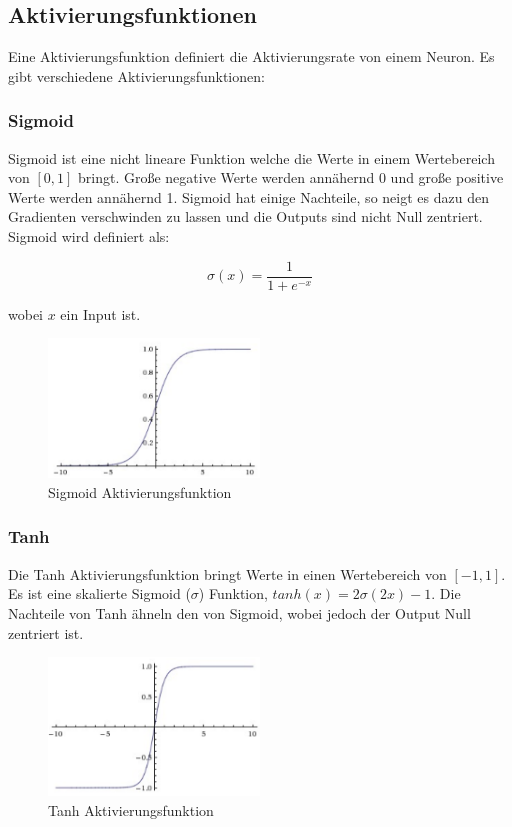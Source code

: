 \newpage
\subsection{Aktivierungsfunktionen}\label{subsection:aktivierungsfunktionen}
Eine Aktivierungsfunktion definiert die Aktivierungsrate von einem Neuron. Es gibt verschiedene Aktivierungsfunktionen:

\subsubsection{Sigmoid}
Sigmoid ist eine nicht lineare Funktion welche die Werte in einem Wertebereich von $ [0, 1] $ bringt.
Große negative Werte werden annähernd 0 und große positive Werte werden annähernd 1. Sigmoid hat einige Nachteile, so neigt es dazu den Gradienten
verschwinden zu lassen und die Outputs sind nicht Null zentriert. Sigmoid wird definiert als:

\begin{equation}
  \sigma(x) = \frac{1}{1 + e^{-x}}
\end{equation}

wobei $x$ ein Input ist.

\begin{figure}[H]
  \centering
  \includegraphics[width=0.5\textwidth]{resources/nn/sigmoid.png}
  \caption{
    Sigmoid Aktivierungsfunktion 
    \cite{neuron-model}
  }
  \label{image:sigmoid}
\end{figure}

\subsubsection{Tanh}
Die Tanh Aktivierungsfunktion bringt Werte in einen Wertebereich von $ [-1, 1] $. Es ist eine skalierte Sigmoid ($ \sigma $) Funktion,
$ tanh(x) = 2\sigma(2x) - 1 $. Die Nachteile von Tanh ähneln den von Sigmoid, wobei jedoch der Output Null zentriert ist.

\begin{figure}[H]
  \centering
  \includegraphics[width=0.5\textwidth]{resources/nn/tanh.png}
  \caption{
    Tanh Aktivierungsfunktion 
    \cite{neuron-model}
  }
  \label{image:tanh}
\end{figure}

